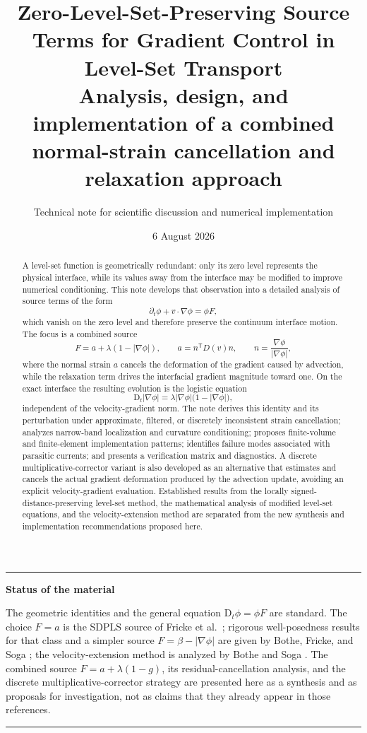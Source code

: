 \documentclass[11pt,a4paper]{article}
\title{\vspace{-1.5cm}\textbf{Zero-Level-Set-Preserving Source Terms for Gradient Control in Level-Set Transport}\\[0.5em]
\large Analysis, design, and implementation of a combined normal-strain cancellation and relaxation approach}
\author{Technical note for scientific discussion and numerical implementation}
\date{6 August 2026}
\theoremstyle{definition}
\theoremstyle{remark}
\newcommand{\abs}[1]{\left\lvert #1\right\rvert}
\newcommand{\material}{\mathrm{D}_t}
\newenvironment{keybox}[1]{%
  \begin{center}\begin{minipage}{0.94\textwidth}
  \color{noteblue}\hrule\vspace{0.5em}
  \textbf{#1}\par\color{black}\vspace{0.3em}
}{%
  \vspace{0.4em}\color{noteblue}\hrule\color{black}
  \end{minipage}\end{center}
}
\begin{document}
\maketitle

\begin{abstract}
A level-set function is geometrically redundant: only its zero level represents the physical interface, while its values away from the interface may be modified to improve numerical conditioning. This note develops that observation into a detailed analysis of source terms of the form
\[
  \partial_t\phi+v\cdot\nabla\phi=\phi F,
\]
which vanish on the zero level and therefore preserve the continuum interface motion. The focus is a combined source
\[
  F=a+\lambda(1-\abs{\nabla\phi}),
  \qquad
  a=n^{\mathsf T}D(v)n,
  \qquad
  n=\frac{\nabla\phi}{\abs{\nabla\phi}},
\]
where the normal strain $a$ cancels the deformation of the gradient caused by advection, while the relaxation term drives the interfacial gradient magnitude toward one. On the exact interface the resulting evolution is the logistic equation
\[
  \material \abs{\nabla\phi}=\lambda\abs{\nabla\phi}\bigl(1-\abs{\nabla\phi}\bigr),
\]
independent of the velocity-gradient norm. The note derives this identity and its perturbation under approximate, filtered, or discretely inconsistent strain cancellation; analyzes narrow-band localization and curvature conditioning; proposes finite-volume and finite-element implementation patterns; identifies failure modes associated with parasitic currents; and presents a verification matrix and diagnostics. A discrete multiplicative-corrector variant is also developed as an alternative that estimates and cancels the actual gradient deformation produced by the advection update, avoiding an explicit velocity-gradient evaluation. Established results from the locally signed-distance-preserving level-set method, the mathematical analysis of modified level-set equations, and the velocity-extension method are separated from the new synthesis and implementation recommendations proposed here.
\end{abstract}

\begin{keybox}{Status of the material}
The geometric identities and the general equation $\material\phi=\phi F$ are standard. The choice $F=a$ is the SDPLS source of Fricke et al.\ \cite{FrickeEtAl2022}; rigorous well-posedness results for that class and a simpler source $F=\beta-\abs{\nabla\phi}$ are given by Bothe, Fricke, and Soga \cite{BotheFrickeSoga2024}; the velocity-extension method is analyzed by Bothe and Soga \cite{BotheSoga2026}. The combined source $F=a+\lambda(1-g)$, its residual-cancellation analysis, and the discrete multiplicative-corrector strategy are presented here as a synthesis and as proposals for investigation, not as claims that they already appear in those references.
\end{keybox}
\end{document}
